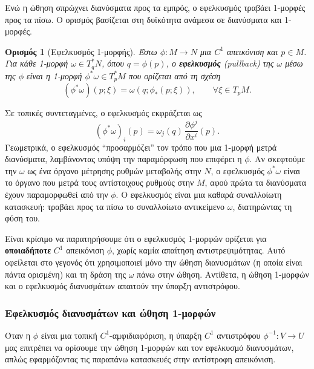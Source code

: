 \documentclass[11pt,a4paper,twoside,openright]{book}
\newtheorem{definition}[lemma]{Ορισμός}
\begin{document}
Ενώ η ώθηση σπρώχνει διανύσματα προς τα εμπρός, ο εφελκυσμός τραβάει 1-μορφές προς τα πίσω. Ο ορισμός βασίζεται στη δυϊκότητα ανάμεσα σε διανύσματα και 1-μορφές.

\begin{definition}[Εφελκυσμός 1-μορφής]
Έστω $\phi: M \to N$ μια $C^1$ απεικόνιση και $p \in M$. Για κάθε 1-μορφή $\omega \in T_{q}^*N$, όπου $q = \phi(p)$, ο \textbf{εφελκυσμός} (pullback) της $\omega$ μέσω της $\phi$ είναι η 1-μορφή $\phi^* \omega \in T_p^*M$ που ορίζεται από τη σχέση
\begin{equation}
(\phi^* \omega)(p; \xi) = \omega(q; \phi_*(p; \xi)), \qquad \forall \xi \in T_pM. \label{eq:pullback-def}
\end{equation}
\end{definition}

Σε τοπικές συντεταγμένες, ο εφελκυσμός εκφράζεται ως
\begin{equation}
(\phi^* \omega)_i(p) = \omega_j(q) \, \frac{\partial \phi^j}{\partial x^i}(p). \label{eq:pullback-coord}
\end{equation}
Γεωμετρικά, ο εφελκυσμός ``προσαρμόζει'' τον τρόπο που μια 1-μορφή μετρά διανύσματα, λαμβάνοντας υπόψη την παραμόρφωση που επιφέρει η $\phi$. Αν σκεφτούμε την $\omega$ ως ένα όργανο μέτρησης ρυθμών μεταβολής στην $N$, ο εφελκυσμός $\phi^* \omega$ είναι το όργανο που μετρά τους αντίστοιχους ρυθμούς στην $M$, αφού πρώτα τα διανύσματα έχουν παραμορφωθεί από την $\phi$. Ο εφελκυσμός είναι μια καθαρά συναλλοίωτη κατασκευή: τραβάει προς τα πίσω το συναλλοίωτο αντικείμενο $\omega$, διατηρώντας τη φύση του.

Είναι κρίσιμο να παρατηρήσουμε ότι ο εφελκυσμός 1-μορφών ορίζεται για \textbf{οποιαδήποτε} $C^1$ απεικόνιση $\phi$, χωρίς καμία απαίτηση αντιστρεψιμότητας. Αυτό οφείλεται στο γεγονός ότι χρησιμοποιεί μόνο την ώθηση διανυσμάτων (η οποία είναι πάντα ορισμένη) και τη δράση της $\omega$ πάνω στην ώθηση. Αντίθετα, η ώθηση 1-μορφών και ο εφελκυσμός διανυσμάτων απαιτούν την ύπαρξη αντιστρόφου.

\subsubsection{Εφελκυσμός διανυσμάτων και ώθηση 1-μορφών}

Όταν η $\phi$ είναι μια τοπική $C^1$-αμφιδιαφόριση, η ύπαρξη $C^1$ αντιστρόφου $\phi^{-1}: V \to U$ μας επιτρέπει να ορίσουμε την ώθηση 1-μορφών και τον εφελκυσμό διανυσμάτων, απλώς εφαρμόζοντας τις παραπάνω κατασκευές στην αντίστροφη απεικόνιση.
\end{document}
